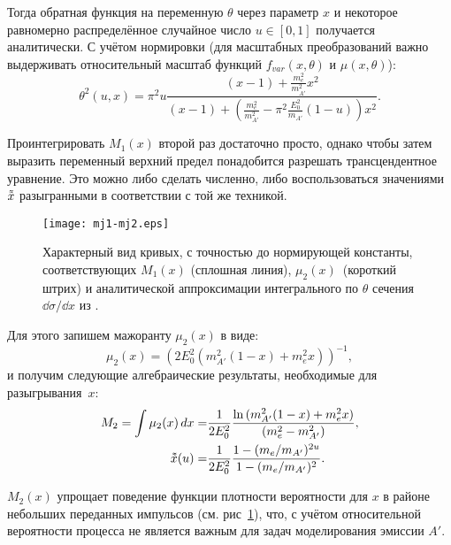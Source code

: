 Тогда обратная функция на переменную $\theta$ через параметр $x$ и некоторое
равномерно распределённое случайное число $u \in [0, 1]$ получается
аналитически. С учётом нормировки
(для масштабных преобразований важно выдерживать относительный масштаб функций
$f_{var}(x, \theta)$ и $\mu(x, \theta)$):
\begin{equation}
    \theta^2 (u, x) = \pi^2 u \frac{ (x-1) + \frac{m_{e}^2}{m_{A'}^2} x^2 }
              { (x-1) + (\frac{m_{e}^2}{m_{A'}^2} - \pi^2 \frac{E_0^2}{m_{A'}} (1-u)) x^2 }.
    \label{eq:thetaExpr}
\end{equation}

Проинтегрировать
$M_1(x)$
второй раз достаточно просто, однако
чтобы затем выразить переменный верхний предел понадобится разрешать
трансцендентное уравнение. Это можно либо сделать численно, либо
воспользоваться значениями $\vardbtilde{x}$ разыгранными в соответствии с той
же техникой.

\begin{figure}
    \centering
    \texttt{[image: mj1-mj2.eps]}
    \caption{ Характерный вид кривых, с точностью до нормирующей константы,
    соответствующих $M_1(x)$ (сплошная линия),
    $\mu_2(x)$~(короткий штрих)
    и аналитической аппроксимации интегрального по $\theta$ сечения
    $\dd{\sigma}/\dd{x}$ из \cite{bjorken}.}
    \label{fig:mj1mj2}
\end{figure}

Для этого запишем мажоранту $\mu_2(x)$ в виде:
\begin{equation}
    \mu_2(x) = ( 2 E_0^2 (m_{A'}^2 (1 - x) + m_e^2 x ) )^{-1},
\end{equation}
и получим следующие алгебраические результаты, необходимые для
разыгрывания~$x$:
\begin{align}
    M_2 = \int \mu_2(x) \dd{x} =& \frac{1}{2 E_0^2} \frac{\ln{( m_{A'}^2 (1 - x) + m_e^2 x )}}{(m_e^2 - m_{A'}^2)}, \\
    \vardbtilde{x}(u) =& \frac{1}{2 E_0^2} \frac{1-(m_e/m_{A'})^{2 u}}{1-(m_e/m_{A'})^{2}}.
    \label{eq:mj2x}
\end{align}

$M_2(x)$ упрощает поведение функции плотности вероятности
для $x$ в районе небольших переданных импульсов (см.
рис~\ref{fig:mj1mj2}), что, с учётом
относительной вероятности процесса не является важным для задач моделирования
эмиссии $A'$.

